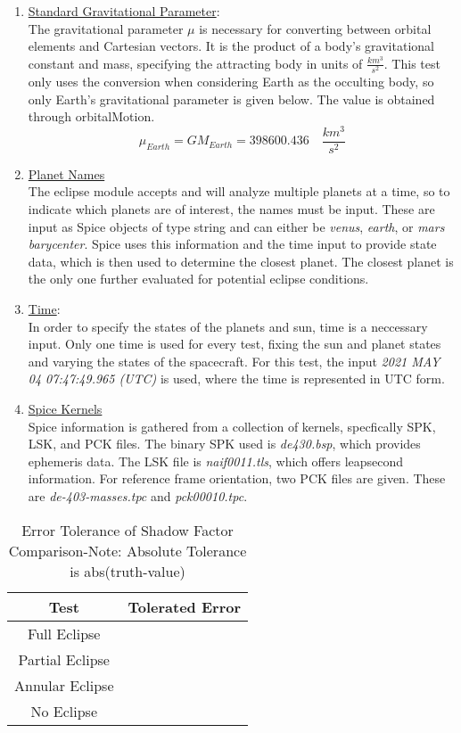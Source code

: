 \begin{enumerate}
\begin{table}[H]
\begin{tabular}{c|c|c|c}
			\hline
		\end{tabular}
	\end{table}
	\item \underline{Standard Gravitational Parameter}:\\
	The gravitational parameter $\mu$ is necessary for converting between orbital elements and Cartesian vectors. It is the product of a body's gravitational constant and mass, specifying the attracting body in units of $\frac{km^3}{s^2}$. This test only uses the conversion when considering Earth as the occulting body, so only Earth's gravitational parameter is given below. The value is obtained through orbitalMotion.
	\begin{equation}
		\mu_{Earth} = GM_{Earth}=398600.436\quad \frac{km^3}{s^2}
	\end{equation}
	\item \underline{Planet Names}\\
	The eclipse module accepts and will analyze multiple planets at a time, so to indicate which planets are of interest, the names must be input. These are input as Spice objects of type string and can either be \textit{venus}, \textit{earth}, or \textit{mars barycenter}. Spice uses this information and the time input to provide state data, which is then used to determine the closest planet. The closest planet is the only one further evaluated for potential eclipse conditions.
	\item \underline{Time}:\\
	In order to specify the states of the planets and sun, time is a neccessary input. Only one time is used for every test, fixing the sun and planet states and varying the states of the spacecraft. For this test, the input \textit{2021 MAY 04 07:47:49.965 (UTC)} is used, where the time is represented in UTC form.
	\item \underline{Spice Kernels}\\
	Spice information is gathered from a collection of kernels, specfically SPK, LSK, and PCK files. The binary SPK used is \textit{de430.bsp}, which provides ephemeris data. The LSK file is \textit{naif0011.tls}, which offers leapsecond information. For reference frame orientation, two PCK files are given. These are \textit{de-403-masses.tpc} and \textit{pck00010.tpc}.
\end{enumerate}	
\begin{table}[H]
	\caption{Error Tolerance of Shadow Factor Comparison-Note: Absolute Tolerance is abs(truth-value)}
	\centering \fontsize{10}{10}\selectfont
	\begin{tabular}{c|c}
		\hline \textbf{Test} & \textbf{Tolerated Error}\\ \hline Full Eclipse & \\ Partial Eclipse & \\
		Annular Eclipse & \\
		No Eclipse& \\
		\hline
	\end{tabular}
\end{table}

